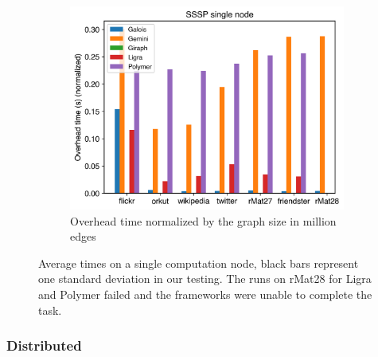 \begin{figure}
\begin{subfigure}{0.3\textwidth}
		\includegraphics[width=\linewidth]{../../plots/singleNodeSSSP_overheadTimeNormalized.png}
		\caption{Overhead time normalized by the graph size in million edges}
		\label{fig:singleNodeSSSP_overheadNormalized}
	\end{subfigure}
	\caption{Average times on a single computation node, black bars represent one standard deviation in our testing.
	The runs on rMat28 for Ligra and Polymer failed and the frameworks were unable to complete the task.}
	\label{fig:singleNodeSSSP}
\end{figure}








\subsubsection{Distributed}

